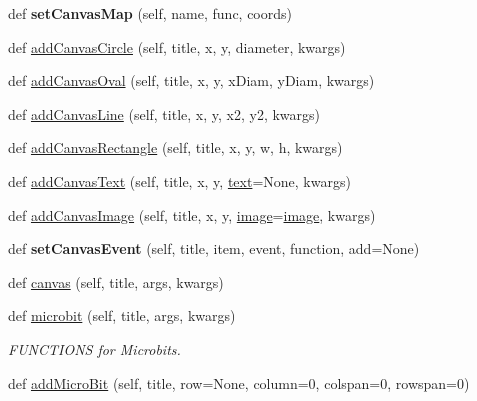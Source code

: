 \begin{DoxyCompactItemize}
\mbox{\label{classappjar_1_1gui_a47753922fb1fe33acfafdca3debf5bfe}} 
def {\bfseries set\+Canvas\+Map} (self, name, func, coords)
\item 
def \hyperlink{classappjar_1_1gui_abaf6dd085826e9e63377faf7e305bd2b}{add\+Canvas\+Circle} (self, title, x, y, diameter, kwargs)
\item 
def \hyperlink{classappjar_1_1gui_a1ae6c2caa5a92980273d7d5397de8473}{add\+Canvas\+Oval} (self, title, x, y, x\+Diam, y\+Diam, kwargs)
\item 
def \hyperlink{classappjar_1_1gui_a0be7617ccf839c8f7d0e171c77e81172}{add\+Canvas\+Line} (self, title, x, y, x2, y2, kwargs)
\item 
def \hyperlink{classappjar_1_1gui_ac989d3dfc3a89144b21692dc55fb9337}{add\+Canvas\+Rectangle} (self, title, x, y, w, h, kwargs)
\item 
def \hyperlink{classappjar_1_1gui_ad5e036e4776596fafc526c644f35e530}{add\+Canvas\+Text} (self, title, x, y, \hyperlink{classappjar_1_1gui_a221b516425bf76dd8560ec9f4818182f}{text}=None, kwargs)
\item 
def \hyperlink{classappjar_1_1gui_ab9238a001df0ce23b2802099be4d01d1}{add\+Canvas\+Image} (self, title, x, y, \hyperlink{classappjar_1_1gui_a7bf059e8a509826c130aacb56902d593}{image}=\hyperlink{classappjar_1_1gui_a7bf059e8a509826c130aacb56902d593}{image}, kwargs)
\item 
\mbox{\label{classappjar_1_1gui_ab7370f7985ef23b397d4d8d6914b81a2}} 
def {\bfseries set\+Canvas\+Event} (self, title, item, event, function, add=None)
\item 
def \hyperlink{classappjar_1_1gui_a565e4061199183dac66e25daf55d4e2c}{canvas} (self, title, args, kwargs)
\item 
def \hyperlink{classappjar_1_1gui_a3ce620c25bd33f4bc98a3b199f32136b}{microbit} (self, title, args, kwargs)
\begin{DoxyCompactList}\small\item\em F\+U\+N\+C\+T\+I\+O\+NS for Microbits. \end{DoxyCompactList}\item 
def \hyperlink{classappjar_1_1gui_a240e0115334d1c35bfe1893b421ea9c5}{add\+Micro\+Bit} (self, title, row=None, column=0, colspan=0, rowspan=0)
\item 
\mbox{\label{classappjar_1_1gui_ae17ff8b31494cd4be55262f2d60c11b7}} 

\end{DoxyCompactItemize}

